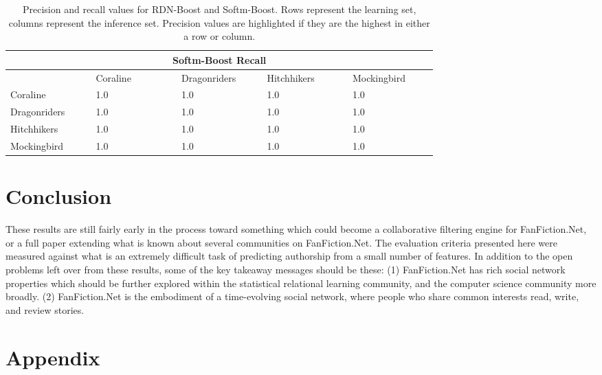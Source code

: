 \documentclass[letterpaper]{article}
\begin{document}
\begin{table}[ht]
        \begin{tabular}{|p{0.15\linewidth}|p{0.15\linewidth}|p{0.15\linewidth}|p{0.15\linewidth}|p{0.15\linewidth}|}
        \hline
        \multicolumn{5}{|c|}{Softm-Boost Recall}\\
        \hline
            & Coraline & Dragonriders & Hitchhikers & Mockingbird \\
            \hline
             Coraline & 1.0 & 1.0 & 1.0 & 1.0 \\
             Dragonriders & 1.0 & 1.0 & 1.0 & 1.0 \\
             Hitchhikers & 1.0 & 1.0 & 1.0 & 1.0 \\
             Mockingbird & 1.0 & 1.0 & 1.0 & 1.0 \\
        \hline
        \end{tabular}

    \caption{Precision and recall values for RDN-Boost and Softm-Boost. Rows represent the learning set, columns represent the inference set. Precision values are highlighted if they are the highest in either a row or column.}
    \label{tab:results}

\end{table}

\section{Conclusion}

These results are still fairly early in the process toward something which could become a collaborative filtering engine for FanFiction.Net, or a full paper extending what is known about several communities on FanFiction.Net. The evaluation criteria presented here were measured against what is an extremely difficult task of predicting authorship from a small number of features. In addition to the open problems left over from these results, some of the key takeaway messages should be these: (1) FanFiction.Net has rich social network properties which should be further explored within the statistical relational learning community, and the computer science community more broadly. (2) FanFiction.Net is the embodiment of a time-evolving social network, where people who share common interests read, write, and review stories.

\section{Appendix}
\end{document}
